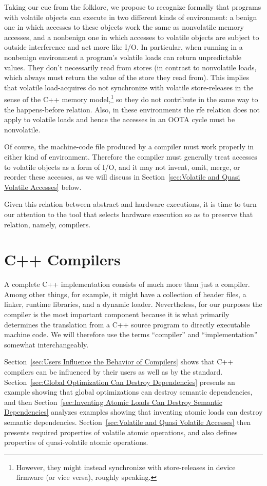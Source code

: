 \documentclass[10]{article}
\begin{document}
Taking our cue from the folklore, we propose to recognize formally
that programs with volatile objects can execute in two different kinds
of environment: a benign one in which accesses to these objects work
the same as nonvolatile memory accesses, and a nonbenign one in which
accesses to volatile objects are subject to outside interference and
act more like I/O.
In particular, when running in a nonbenign environment a program's
volatile loads can return unpredictable values.
They don't necessarily read from stores (in contrast to nonvolatile loads,
which always must return the value of the store they read from).
This implies that volatile load-acquires do not synchronize with
volatile store-releases in the sense of the C++ memory model,\footnote{
	However, they might instead synchronize with store-releases in
	device firmware (or vice versa), roughly speaking.}
so they do not contribute in the same way to the happens-before relation.
Also, in these environments the rfe relation does not apply to volatile
loads and hence the accesses in an OOTA cycle must be nonvolatile.

Of course, the machine-code file produced by a compiler must work
properly in either kind of environment.
Therefore the compiler must generally treat accesses to volatile objects
as a form of I/O, and it may not
invent, omit, merge, or reorder these accesses, as we will discuss in
Section~\ref{sec:Volatile and Quasi Volatile Accesses} below.

Given this relation between abstract and hardware executions, it is time
to turn our attention to the tool that selects hardware execution so as
to preserve that relation, namely, compilers.

\section{C++ Compilers}
\label{sec:C++ Compilers}

A complete C++ implementation consists of much more than just a compiler.
Among other things, for example, it might have a collection of
 header files, a linker, runtime libraries, and a dynamic loader.
Nevertheless, for our purposes the compiler is the most important
component because it is what primarily determines the translation from
a C++ source program to directly executable machine code.
We will therefore use the terms ``compiler'' and ``implementation''
somewhat interchangeably.

Section~\ref{sec:Users Influence the Behavior of Compilers}
shows that C++ compilers can be influenced by their users as well
as by the standard.
Section~\ref{sec:Global Optimization Can Destroy Dependencies}
presents an example showing that global optimizations can destroy
semantic dependencies, and then
Section~\ref{sec:Inventing Atomic Loads Can Destroy Semantic Dependencies}
analyzes examples showing that inventing atomic loads can destroy
semantic dependencies.
Section~\ref{sec:Volatile and Quasi Volatile Accesses}
then presents required properties of volatile atomic operations, and
also defines properties of quasi-volatile atomic operations.
\end{document}
